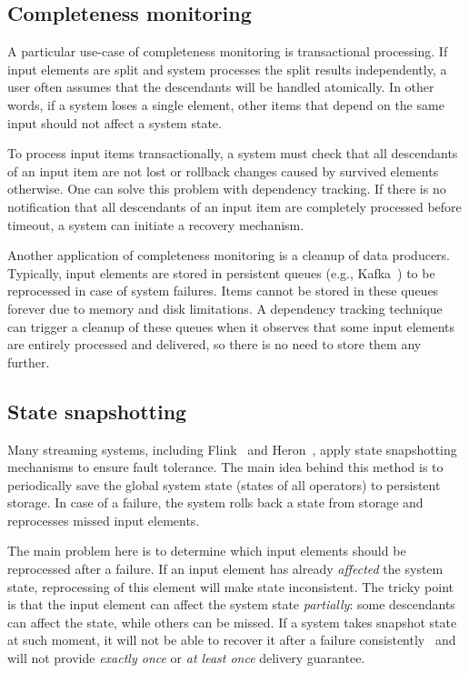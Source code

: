 \subsection{Completeness monitoring}

A particular use-case of completeness monitoring is transactional processing. If input elements are split and system processes the split results independently, a user often assumes that the descendants will be handled atomically. In other words, if a system loses a single element, other items that depend on the same input should not affect a system state. 

To process input items transactionally, a system must check that all descendants of an input item are not lost or rollback changes caused by survived elements otherwise. One can solve this problem with dependency tracking. If there is no notification that all descendants of an input item are completely processed before timeout, a system can initiate a recovery mechanism.

Another application of completeness monitoring is a cleanup of data producers. Typically, input elements are stored in persistent queues (e.g., Kafka~\cite{kreps2011kafka}) to be reprocessed in case of system failures. Items cannot be stored in these queues forever due to memory and disk limitations. A dependency tracking technique can trigger a cleanup of these queues when it observes that some input elements are entirely processed and delivered, so there is no need to store them any further.

\subsection{State snapshotting}
Many streaming systems, including Flink~\cite{Carbone:2017:SMA:3137765.3137777} and Heron~\cite{Kulkarni:2015:THS:2723372.2742788}, apply state snapshotting mechanisms to ensure fault tolerance. The main idea behind this method is to periodically save the global system state (states of all operators) to persistent storage. In case of a failure, the system rolls back a state from storage and reprocesses missed input elements. 

The main problem here is to determine which input elements should be reprocessed after a failure. If an input element has already {\em affected} the system state, reprocessing of this element will make state inconsistent. The tricky point is that the input element can affect the system state {\em partially}: some descendants can affect the state, while others can be missed. If a system takes snapshot state at such moment, it will not be able to recover it after a failure consistently~\cite{2015arXiv150608603C} and will not provide {\em exactly once} or {\em at least once} delivery guarantee.

